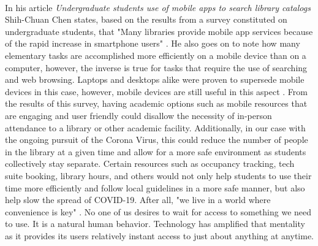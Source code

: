 \paragraph{}
 In his article \textit{Undergraduate students use of mobile apps to search library catalogs} Shih-Chuan Chen states, based on the results from a survey constituted on undergraduate students, that "Many libraries provide mobile app services because of the rapid increase in smartphone users" \cite{undergrad_ma}. He also goes on to note how many elementary tasks are accomplished more efficiently on a mobile device than on a computer, however, the inverse is true for tasks that require the use of searching and web browsing. Laptops and desktops alike were proven to supersede mobile devices in this case, however, mobile devices are still useful in this aspect \cite{undergrad_ma}. From the results of this survey, having academic options such as mobile resources that are engaging and user friendly could disallow the necessity of in-person attendance to a library or other academic facility. Additionally, in our case with the ongoing pursuit of the Corona Virus, this could reduce the number of people in the library at a given time and allow for a more safe environment as students collectively stay separate. Certain resources such as occupancy tracking, tech suite booking, library hours, and others would not only help students to use their time more efficiently and follow local guidelines in a more safe manner, but also help slow the spread of COVID-19. After all, "we live in a world where convenience is key" \cite{mob_ph_app_aca_lib}. No one of us desires to wait for access to something we need to use. It is a natural human behavior. Technology has amplified that mentality as it provides its users relatively instant access to just about anything at anytime. 

